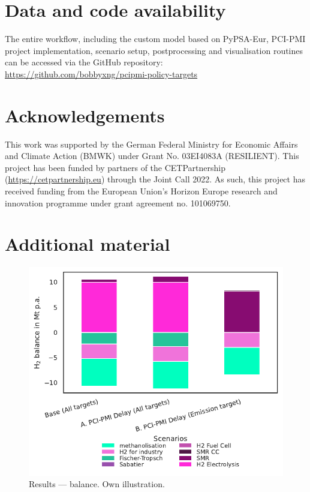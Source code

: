 \documentclass[preprint,12pt]{elsarticle}
\begin{document}
\section*{Data and code availability}
The entire workflow, including the custom model based on PyPSA-Eur, PCI-PMI project implementation, scenario setup, postprocessing and visualisation routines can be accessed via the GitHub repository: \newline 
\href{https://github.com/bobbyxng/pcipmi-policy-targets}{https://github.com/bobbyxng/pcipmi-policy-targets}

\section*{Acknowledgements}
This work was supported by the German Federal Ministry for Economic Affairs and Climate Action (BMWK) under Grant No. 03EI4083A (RESILIENT). This project has been funded by partners of the CETPartnership (\href{https://cetpartnership.eu}{https://cetpartnership.eu}) through the Joint Call 2022. As such, this project has received funding from the European Union's Horizon Europe research and innovation programme under grant agreement no. 101069750.


\newpage
\appendix
\section{Additional material}
\label{app:additional_material}

\begin{figure}[htbp]
  \centering
  \includegraphics[width=0.9\linewidth]{h2_balance}
  \caption{Results ---  balance. Own illustration.}
  \label{fig:h2_balance}
\end{figure}
\end{document}
